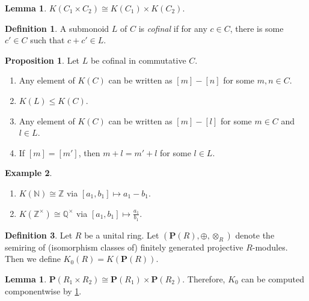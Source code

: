 \documentclass[10pt,letterpaper,cm]{nupset}
\theoremstyle{definition}
\newtheorem{definition}{Definition}
\newtheorem{exmp}[definition]{Example}
\theoremstyle{theorem}
\newtheorem{lemma}[theorem]{Lemma}
\newtheorem{prop}[theorem]{Proposition}
\theoremstyle{remark}
\newcommand{\N}{\mathbb N}
\renewcommand{\P}{\mathbf P}
\newcommand{\Q}{\mathbb Q}
\newcommand{\Z}{\mathbb Z}
\newcommand{\1}{\mathbf{1}}
\newcommand{\0}{\vec 0}
\begin{document}
\begin{lemma}\label{L2}
$K(C_1 \times C_2) \cong K(C_1) \times K(C_2)$.
\end{lemma}

\begin{definition}
A submonoid $L$ of $C$ is \textit{cofinal} if for any $c\in C$, there is some $c' \in C$ such that $c + c' \in L$.
\end{definition}

\begin{prop}\label{prop2} Let $L$ be cofinal in commutative $C$.
\begin{enumerate}
\item Any element of $K(C)$ can be written as $[m]-[n]$ for some $m, n\in  C$.
\item $K(L) \leq K(C)$.
\item Any element of $K(C)$ can be written as $[m] - [l]$ for some $m\in C$ and $l\in L$.
\item If $[m] = [m']$, then $m + l = m' +l$ for some $l\in L$.
\end{enumerate}
\end{prop}

\begin{exmp}\label{Z} $ $
\begin{enumerate}
\item $K(\N) \cong \Z$ via $[a_1, b_1] \mapsto a_1 - b_1$.
\item $K(\Z^{\times}) \cong \Q^{\times}$ via $[a_1, b_1] \mapsto \frac{a_1}{b_1}$.
\end{enumerate}
\end{exmp}

\begin{definition}
Let $R$ be a unital ring. Let $\left(\P(R), \oplus, \otimes_R\right)$ denote the semiring  of (isomorphism classes of) finitely generated projective $R$-modules. Then we define $K_0(R) = K(\P(R))$.
\end{definition}

\begin{lemma}
$\P(R_1 \times R_2) \cong \P(R_1) \times \P(R_2)$. Therefore, $K_0$ can be computed componentwise by \cref{L2}. 
\end{lemma}
\end{document}
